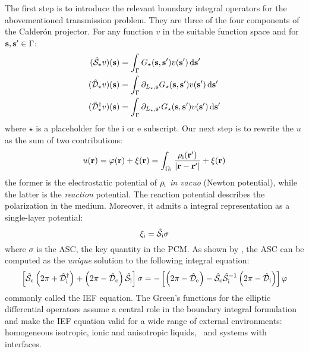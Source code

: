 The first step is to introduce the relevant boundary integral operators for the
abovementioned transmission problem.
They are three of the four components of the Calder\'on projector.
For any function $v$ in the suitable function space and for $\mathbf{s}, \mathbf{s}^\prime \in \Gamma$:
\begin{equation}
\begin{aligned}
  (\hat{\mathcal{S}}_\star v)(\mathbf{s}) &= \int_\Gamma
  G_\star(\mathbf{s}, \mathbf{s}^\prime)v(\mathbf{s}^\prime)\mathop{}\!\mathrm{d} \mathbf{s}^\prime \\
  (\hat{\mathcal{D}}_\star v)(\mathbf{s}) &= \int_\Gamma \partial_{L_\star,\mathbf{s}}
  G_\star(\mathbf{s}, \mathbf{s}^\prime)v(\mathbf{s}^\prime)\mathop{}\!\mathrm{d} \mathbf{s}^\prime \\
  (\hat{\mathcal{D}}^\dagger_\star v)(\mathbf{s}) &= \int_\Gamma
\partial_{L_\star,\mathbf{s}^\prime}
  G_\star(\mathbf{s}, \mathbf{s}^\prime)v(\mathbf{s}^\prime)\mathop{}\!\mathrm{d} \mathbf{s}^\prime \\
\end{aligned}
\end{equation}
where $\star$ is a placeholder for the $\mathrm{i}$ or $\mathrm{e}$ subscript.
Our next step is to rewrite the $u$ as the sum of two contributions:
\begin{equation}
  u(\mathbf{r}) = \varphi(\mathbf{r}) + \xi(\mathbf{r}) = \int_{\Omega_\mathrm{i}}
  \frac{\rho_\mathrm{i}(\mathbf{r}^\prime)}{|\mathbf{r}-\mathbf{r}^\prime|}
  + \xi(\mathbf{r})
\end{equation}
the former is the electrostatic potential of $\rho_\mathrm{i}$ \emph{in vacuo}
(Newton potential), while the latter is the \emph{reaction} potential.
The reaction potential describes the polarization in the medium.
Moreover, it admits a integral representation as a single-layer
potential:
\begin{equation}
  \xi_\mathrm{i} = \hat{\mathcal{S}}_\mathrm{i}\sigma
\end{equation}
where $\sigma$ is the \ac{ASC}, the key quantity in the \acs{PCM}.
As shown by \citeauthor{Cances1998-og}, the \acs{ASC} can be computed
as the \emph{unique} solution to the following integral equation:
\begin{equation}\label{eq:full-IEF}
  \left[ \hat{\mathcal{S}}_\mathrm{e}\left(2\pi + \hat{\mathcal{D}}^\dagger_\mathrm{i}\right)
  +
  \left(2\pi - \hat{\mathcal{D}}_\mathrm{e}\right)\hat{\mathcal{S}}_\mathrm{i}
  \right]\sigma =
  -\left[\left(2\pi-\hat{\mathcal{D}}_\mathrm{e}\right)
  -\hat{\mathcal{S}}_\mathrm{e}\hat{\mathcal{S}}_\mathrm{i}^{-1}
  \left(2\pi-\hat{\mathcal{D}}_\mathrm{i}\right)
  \right]\varphi
\end{equation}
commonly called the \ac{IEF} equation.
The Green's functions for the elliptic differential operators
assume a central role in the boundary integral formulation and make the
\acs{IEF} equation valid for a wide range of external
environments: homogeneous isotropic, ionic and anisotropic
liquids,~\autocite{Cances1998-og}
and systems with interfaces.~\autocite{Corni2002-dr, Frediani2004-er,
Delgado2013-kd, DiRemigio2016-nn}

